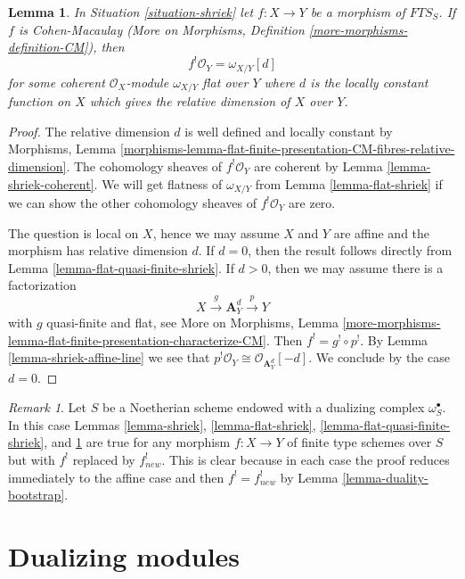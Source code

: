 \documentclass{stacks-project}
\theoremstyle{plain}
\newtheorem{lemma}[subsection]{Lemma}
\theoremstyle{definition}
\theoremstyle{remark}
\newtheorem{remark}[subsection]{Remark}
\numberwithin{equation}{subsection}
\begin{document}
\begin{lemma}
\label{lemma-CM-shriek}
In Situation \ref{situation-shriek} let $f : X \to Y$ be a morphism of
$\textit{FTS}_S$. If $f$ is Cohen-Macaulay (More on Morphisms, Definition
\ref{more-morphisms-definition-CM}), then
$$
f^!\mathcal{O}_Y = \omega_{X/Y}[d]
$$
for some coherent $\mathcal{O}_X$-module $\omega_{X/Y}$ flat over $Y$
where $d$ is the locally constant
function on $X$ which gives the relative dimension of $X$ over $Y$.
\end{lemma}

\begin{proof}
The relative dimension $d$ is well defined and locally constant by
Morphisms, Lemma
\ref{morphisms-lemma-flat-finite-presentation-CM-fibres-relative-dimension}.
The cohomology sheaves of $f^!\mathcal{O}_Y$ are coherent by
Lemma \ref{lemma-shriek-coherent}.
We will get flatness of $\omega_{X/Y}$ from Lemma \ref{lemma-flat-shriek}
if we can show the other cohomology sheaves of $f^!\mathcal{O}_Y$
are zero.

\medskip\noindent
The question is local on $X$, hence we may assume $X$ and $Y$ are affine
and the morphism has relative dimension $d$. If $d = 0$, then the
result follows directly from Lemma \ref{lemma-flat-quasi-finite-shriek}.
If $d > 0$, then we may assume there is a factorization
$$
X \xrightarrow{g} \mathbf{A}^d_Y \xrightarrow{p} Y
$$
with $g$ quasi-finite and flat, see More on Morphisms, Lemma
\ref{more-morphisms-lemma-flat-finite-presentation-characterize-CM}.
Then $f^! = g^! \circ p^!$. By Lemma \ref{lemma-shriek-affine-line}
we see that $p^!\mathcal{O}_Y \cong \mathcal{O}_{\mathbf{A}^d_Y}[-d]$.
We conclude by the case $d = 0$.
\end{proof}

\begin{remark}
\label{remark-the-same-is-true}
Let $S$ be a Noetherian scheme endowed with a dualizing complex
$\omega_S^\bullet$. In this case
Lemmas \ref{lemma-shriek}, \ref{lemma-flat-shriek},
\ref{lemma-flat-quasi-finite-shriek}, and \ref{lemma-CM-shriek}
are true for any morphism $f : X \to Y$ of finite type schemes over $S$
but with $f^!$ replaced by $f_{new}^!$. This is clear because in each
case the proof reduces immediately to the affine case
and then $f^! = f_{new}^!$ by Lemma \ref{lemma-duality-bootstrap}.
\end{remark}




\section{Dualizing modules}
\label{section-dualizing-module}
\end{document}
